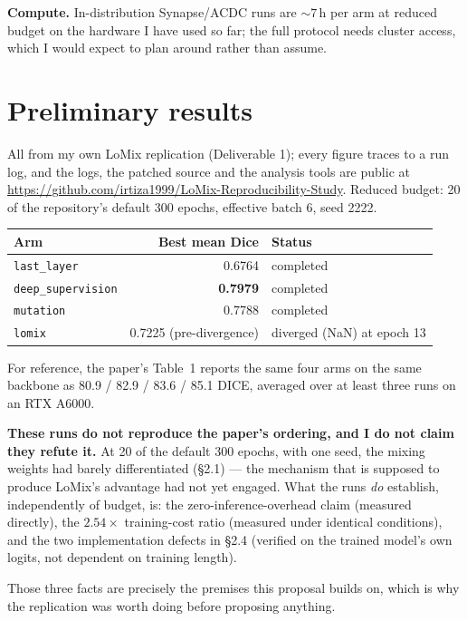 \documentclass[11pt,a4paper]{article}
\newcommand{\code}[1]{\texttt{\small #1}}
\begin{document}
\textbf{Compute.} In-distribution Synapse/ACDC runs are ${\sim}7$\,h per arm at
reduced budget on the hardware I have used so far; the full protocol needs
cluster access, which I would expect to plan around rather than assume.

\section{Preliminary results}

All from my own LoMix replication (Deliverable 1); every figure traces to a run
log, and the logs, the patched source and the analysis tools are public at
\url{https://github.com/irtiza1999/LoMix-Reproducibility-Study}. Reduced budget:
20 of the repository's default 300 epochs, effective batch 6, seed 2222.

\begin{center}
\begin{tabular}{@{}lrl@{}}
\toprule
\textbf{Arm} & \textbf{Best mean Dice} & \textbf{Status} \\
\midrule
\code{last\_layer} & 0.6764 & completed \\
\code{deep\_supervision} & \textbf{0.7979} & completed \\
\code{mutation} & 0.7788 & completed \\
\code{lomix} & 0.7225 (pre-divergence) & diverged (NaN) at epoch 13 \\
\bottomrule
\end{tabular}
\end{center}

For reference, the paper's Table~1 reports the same four arms on the same
backbone as 80.9 / 82.9 / 83.6 / 85.1 DICE, averaged over at least three runs on
an RTX A6000.

\textbf{These runs do not reproduce the paper's ordering, and I do not claim
they refute it.} At 20 of the default 300 epochs, with one seed, the mixing
weights had
barely differentiated (\S2.1) --- the mechanism that is supposed to produce
LoMix's advantage had not yet engaged. What the runs \emph{do} establish,
independently of budget, is: the zero-inference-overhead claim (measured
directly), the $2.54\times$ training-cost ratio (measured under identical
conditions), and the two implementation defects in \S2.4 (verified on the
trained model's own logits, not dependent on training length).

Those three facts are precisely the premises this proposal builds on, which is
why the replication was worth doing before proposing anything.
\end{document}
